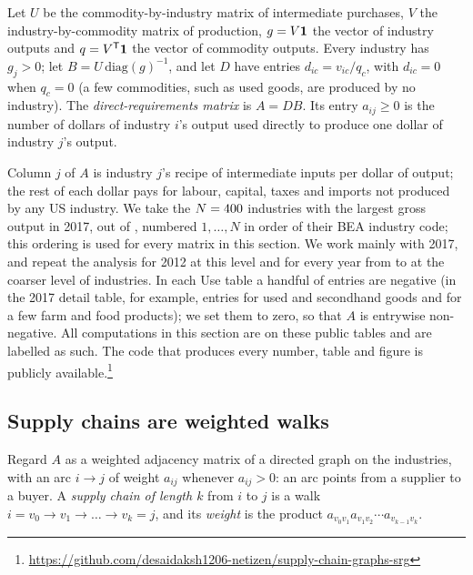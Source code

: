 \begin{definition}
\label{def:direct}
Let $U$ be the commodity-by-industry matrix of intermediate purchases, $V$ the
industry-by-commodity matrix of production, $g=V\mathbf{1}$ the vector of industry
outputs and $q=V^{\mathsf T}\mathbf{1}$ the vector of commodity outputs. Every
industry has $g_j>0$; let $B=U\,\mathrm{diag}(g)^{-1}$, and let $D$ have
entries $d_{ic}=v_{ic}/q_c$, with $d_{ic}=0$ when $q_c=0$ (a few commodities,
such as used goods, are produced by no industry). The
\emph{direct-requirements matrix} is $A=DB$. Its entry $a_{ij}\ge 0$ is the
number of dollars of industry $i$'s output used directly to produce one dollar
of industry $j$'s output.
\end{definition}

Column $j$ of $A$ is industry $j$'s recipe of intermediate inputs per dollar
of output; the rest of each dollar pays for labour, capital, taxes and imports
not produced by any US industry. We take the $N=400$ industries with the
largest gross output in 2017, out of \NIndSource, numbered $1,\dots,N$ in
order of their BEA industry code; this ordering is used for every matrix in
this section. We work mainly with 2017, and repeat the analysis for 2012 at
this level and for every year from \YearFirst{} to \YearLast{} at the coarser
level of \NSummary{} industries. In each Use table a handful of entries are
negative (in the 2017 detail table, for example, entries for used and
secondhand goods and for a few farm and food products); we set them to zero,
so that $A$ is entrywise non-negative. All
computations in this section are on these public tables and are labelled as
such. The code that produces every number, table and figure is publicly
available.\footnote{\url{https://github.com/desaidaksh1206-netizen/supply-chain-graphs-srg}}

\subsection{Supply chains are weighted walks}
\label{subsec:walks}

Regard $A$ as a weighted adjacency matrix of a directed graph on the
industries, with an arc $i\to j$ of weight $a_{ij}$ whenever $a_{ij}>0$: an arc
points from a supplier to a buyer. A \emph{supply chain of length $k$} from $i$
to $j$ is a walk $i=v_0\to v_1\to\dots\to v_k=j$, and its \emph{weight} is the
product $a_{v_0v_1}a_{v_1v_2}\cdots a_{v_{k-1}v_k}$.

